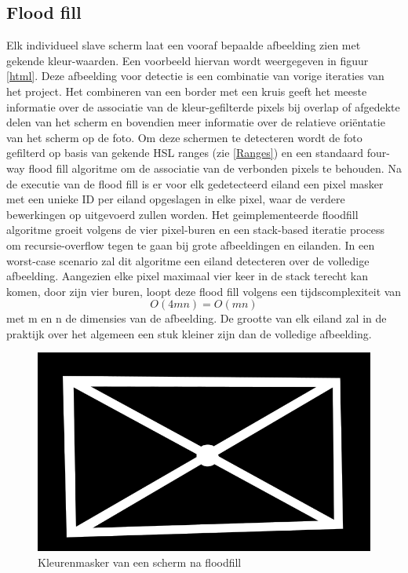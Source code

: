 \subsection{Flood fill}
Elk individueel slave scherm laat een vooraf bepaalde afbeelding zien met gekende kleur-waarden. Een voorbeeld hiervan wordt weergegeven in figuur \ref{html}. Deze afbeelding voor detectie is een combinatie van vorige iteraties van het project. Het combineren van een border met een kruis geeft het meeste informatie over de associatie van de kleur-gefilterde pixels bij overlap of afgedekte delen van het scherm en bovendien meer informatie over de relatieve oriëntatie van het scherm op de foto. Om deze schermen te detecteren wordt de foto gefilterd op basis van gekende HSL ranges (zie \ref{Ranges}) en een standaard four-way flood fill algoritme \cite{floodfill} om de associatie van de verbonden pixels te behouden. Na de executie van de flood fill is er voor elk gedetecteerd eiland een pixel masker met een unieke ID per eiland opgeslagen in elke pixel, waar de verdere bewerkingen op uitgevoerd zullen worden. Het geimplementeerde floodfill algoritme groeit volgens de vier pixel-buren en een stack-based iteratie process om recursie-overflow tegen te gaan bij grote afbeeldingen en eilanden. In een worst-case scenario zal dit algoritme een eiland detecteren over de volledige afbeelding. Aangezien elke pixel maximaal vier keer in de stack terecht kan komen, door zijn vier buren, loopt deze flood fill volgens een tijdscomplexiteit van 
\[O(4mn)=O(mn)\]
 met m en n de dimensies van de afbeelding. De grootte van elk eiland zal in de praktijk over het algemeen een stuk kleiner zijn dan de volledige afbeelding.

\begin{figure}[h]
\centering
\includegraphics[scale=0.5]{img/mask.png}
\caption{Kleurenmasker van een scherm na floodfill}
\end{figure}

